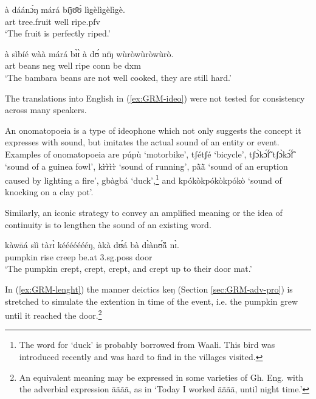 \begin{exe}
\begin{exe}
\begin{exe}
{\begin{exe}
\begin{exe}
\begin{exe}
\begin{exe}
\begin{exe}
\begin{exe}
\begin{exe}
\begin{exe}
\begin{exe}
\begin{exe}
\begin{exe}
\begin{exe}
\begin{exe}
\begin{exe}
\begin{exe}
\begin{exe}
\begin{exe}
\begin{exe}
\begin{exe}
\begin{exe}
\begin{exe}
   \ex\label{ex:GRM-ideo-}
\gll à dáánɔ́ŋ márá bɪ̄jʊ̄ʊ́ lìgèlìgèlìgè.\\
{\sc art} tree.fruit well ripe.{\sc pfv}  {\ideo}\\
  \glt `The fruit is perfectly riped.'
  
  
  \ex\label{ex:GRM-ideo-}
\gll à sìbíé wàà márá bɪ̀ɪ̀ à dʊ́ nɪ̄ŋ wùròwùròwùrò.\\
{\sc art} beans  {\sc neg} well ripe {\sc conn} be   {\sc dxm} {\ideo}\\
  \glt `The bambara beans are not well cooked, they are still hard.'
  

\z 
 \z

The translations into English in (\ref{ex:GRM-ideo}) were not 
tested for consistency across many speakers.

An onomatopoeia is a type of ideophone which not only suggests 
the concept   it expresses with sound, but imitates  the actual sound of an 
entity or event.  Examples of onomatopoeia are {\sls púpù} 
`motorbike', {\sls tʃétʃé} `bicycle', {\sls tʃɔ̀kɔ̃́ɪ̃́ tʃɔ̀kɔ̃́ɪ̃́} `sound 
of 
a 
guinea fowl',  {\sls kr̀r̀r̀r̀} `sound of running',  {\sls pã̀ã̀} `sound of an 
eruption caused by lighting a fire',  {\sls gbàgbá}  `duck',\footnote{The 
word for `duck' is probably borrowed from Waali. This bird was introduced 
recently and was hard to find in the villages visited.}   and {\sls 
kpókòkpókòkpókò} `sound of knocking on a clay pot'.


 Similarly, an iconic strategy to convey an amplified meaning or the idea of
continuity is to lengthen the sound of an existing word. 


 \ea\label{ex:GRM-lenght}
   \gll  kàwāá sìì tàrɪ̀ kéééééééŋ, àkà dʊ́á  bà dɪ̀ànʊ̃́ã́ nɪ̀.\\
pumpkin rise {creep} {\advm} {\conn} {be.at} {\sc 3.sg.poss} door {\postp}\\
\glt `The pumpkin crept, crept, crept, and crept up to their door mat.'
\z

In (\ref{ex:GRM-lenght}) the manner deictics {\sls keŋ} (Section
\ref{sec:GRM-adv-pro}) is stretched to simulate the extention in time of the
event, i.e. the pumpkin grew until it reached the door.\footnote{An equivalent
meaning may be expressed in some varieties of Gh. Eng.  with the 
adverbial
expression  {\sls ãããã}, as in `Today I worked  {\sls ãããã}, 
until night 
time.'}





\end{exe}
\end{exe}
\end{exe}
\end{exe}
\end{exe}
\end{exe}
\end{exe}
\end{exe}
\end{exe}
\end{exe}
\end{exe}
\end{exe}
\end{exe}
\end{exe}
\end{exe}
\end{exe}
\end{exe}
\end{exe}
\end{exe}
\end{exe}
\end{exe}}
\end{exe}
\end{exe}
\end{exe}
